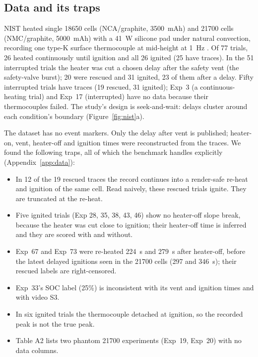 \documentclass[11pt]{article}
\begin{document}
\subsection{Data and its traps}
NIST heated single 18650 cells (NCA/graphite, 3500~mAh) and 21700 cells (NMC/graphite, 5000~mAh) with a 41~W
silicone pad under natural convection, recording one type-K
surface thermocouple at mid-height at 1~Hz \citep{tam2026intervention,nist2025heatdata}. Of 77 trials, 26 heated
continuously until ignition and all 26 ignited (25 have traces). In the 51 interrupted trials the heater was cut a
chosen delay after the safety vent (the safety-valve burst); 20 were rescued and 31 ignited, 23 of them after a delay.
Fifty interrupted trials have traces (19 rescued, 31 ignited); Exp~3 (a continuous-heating trial) and Exp~17 (interrupted) have no
data because their thermocouples failed. The study's design is seek-and-wait: delays cluster around each condition's boundary
(Figure~\ref{fig:nist}a).

The dataset has no event markers. Only the delay after vent is published; heater-on, vent, heater-off and ignition
times were reconstructed from the traces. We found the following traps, all of which the benchmark handles explicitly
(Appendix~\ref{app:data}):
\begin{itemize}
  \item In 12 of the 19 rescued traces the record continues into a render-safe re-heat and ignition of the same cell.
  Read naively, these rescued trials ignite. They are truncated at the re-heat.
  \item Five ignited trials (Exp 28, 35, 38, 43, 46) show no heater-off slope break, because the heater was cut close
  to ignition; their heater-off time is inferred and they are scored with and without.
  \item Exp~67 and Exp~73 were re-heated 224~s and 279~s after heater-off, before the latest delayed ignitions seen in
  the 21700 cells (297 and 346~s); their rescued labels are right-censored.
  \item Exp~33's SOC label (25\%) is inconsistent with its vent and ignition times and with video S3.
  \item In six ignited trials the thermocouple detached at ignition, so the recorded peak is not the true peak.
  \item Table A2 lists two phantom 21700 experiments (Exp~19, Exp~20) with no data columns.
\end{itemize}
\end{document}
